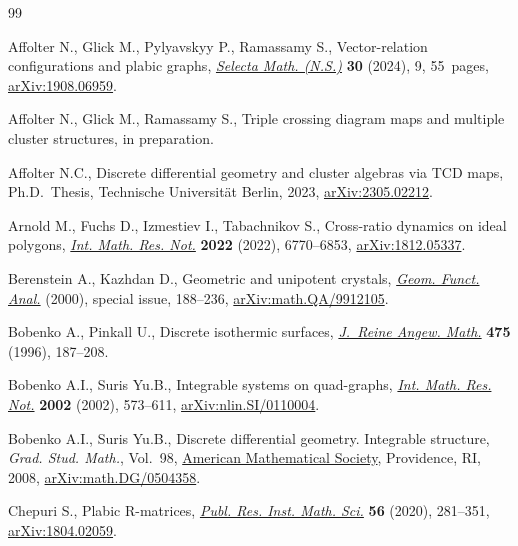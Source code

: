 \documentclass[10pt,a4paper]{amsart}
\numberwithin{equation}{section}
\begin{document}
\begin{thebibliography}{99}
\footnotesize\itemsep=0pt

Affolter N., Glick M., Pylyavskyy P., Ramassamy S., Vector-relation
 configurations and plabic graphs,
 \href{https://doi.org/10.1007/s00029-023-00898-z}{\textit{Selecta Math.
 (N.S.)}} \textbf{30} (2024), 9, 55~pages,
 \href{http://arxiv.org/abs/1908.06959}{arXiv:1908.06959}.

Affolter N., Glick M., Ramassamy S., Triple crossing diagram maps and multiple
 cluster structures, {i}n preparation.

Affolter N.C., Discrete differential geometry and cluster algebras via {TCD}
 maps, Ph.D.~Thesis, {T}echnische Universit\"at Berlin, 2023,
 \href{http://arxiv.org/abs/2305.02212}{arXiv:2305.02212}.

Arnold M., Fuchs D., Izmestiev I., Tabachnikov S., Cross-ratio dynamics on
 ideal polygons, \href{https://doi.org/10.1093/imrn/rnaa289}{\textit{Int.
 Math. Res. Not.}} \textbf{2022} (2022), 6770--6853,
 \href{http://arxiv.org/abs/1812.05337}{arXiv:1812.05337}.

Berenstein A., Kazhdan D., Geometric and unipotent crystals,
 \href{https://doi.org/10.1007/978-3-0346-0422-2_8}{\textit{Geom. Funct.
 Anal.}} (2000), special issue, 188--236,
 \href{http://arxiv.org/abs/math.QA/9912105}{arXiv:math.QA/9912105}.

Bobenko A., Pinkall U., Discrete isothermic surfaces,
 \href{https://doi.org/10.1515/crll.1996.475.187}{\textit{J.~Reine Angew.
 Math.}} \textbf{475} (1996), 187--208.

Bobenko A.I., Suris Yu.B., Integrable systems on quad-graphs,
 \href{https://doi.org/10.1155/S1073792802110075}{\textit{Int. Math. Res.
 Not.}} \textbf{2002} (2002), 573--611,
 \href{http://arxiv.org/abs/nlin.SI/0110004}{arXiv:nlin.SI/0110004}.

Bobenko A.I., Suris Yu.B., Discrete differential geometry. Integrable structure,
 \textit{Grad. Stud. Math.}, Vol.~98,
 \href{https://doi.org/10.1090/gsm/098}{American Mathematical Society},
 Providence, RI, 2008,
 \href{http://arxiv.org/abs/math.DG/0504358}{arXiv:math.DG/0504358}.

Chepuri S., Plabic {R}-matrices,
 \href{https://doi.org/10.4171/prims/56-2-2}{\textit{Publ. Res. Inst. Math.
 Sci.}} \textbf{56} (2020), 281--351,
 \href{http://arxiv.org/abs/1804.02059}{arXiv:1804.02059}.


\end{thebibliography}
\end{document}
